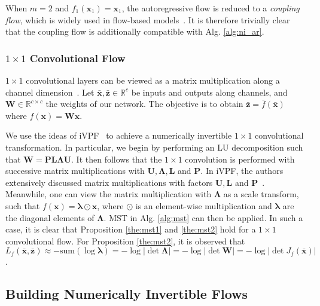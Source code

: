 \documentclass{article}
\newcommand{\qv}[1]{\bar{\mathbf{#1}}}
\begin{document}
When $m = 2$ and $f_1(\mathbf{x}_1) = \mathbf{x}_1$, the autoregressive flow is reduced to a \textit{coupling flow}, which is widely used in flow-based models~\cite{dinh2014nice,dinh2016density,ho2019flow++}. It is therefore trivially clear that the coupling flow is additionally compatible with Alg. \ref{alg:ni_ar}.

\subsubsection{$1 \times 1$ Convolutional Flow}

$1 \times 1$ convolutional layers can be viewed as a matrix multiplication along a channel dimension~\cite{kingma2018glow}. Let $\qv{x}, \qv{z} \in \mathbb{R}^c$ be inputs and outputs along channels, and $\mathbf{W} \in \mathbb{R}^{c \times c}$ the weights of our network. The objective is to obtain $\qv{z} = \bar{f} (\qv{x})$ where $f(\mathbf{x}) = \mathbf{W} \mathbf{x}$.

We use the ideas of iVPF~\cite{zhang2021ivpf} to achieve a numerically invertible $1 \times 1$ convolutional transformation. In particular, we begin by performing an LU decomposition such that $\mathbf{W} = \mathbf{P} \mathbf{L} \mathbf{\Lambda} \mathbf{U}$. It then follows that the $1 \times 1$ convolution is performed with successive matrix multiplications with $\mathbf{U}, \mathbf{\Lambda}, \mathbf{L}$ and $ \mathbf{P}$. In iVPF, the authors extensively discussed matrix multiplications with factors $\mathbf{U}, \mathbf{L} $ and $ \mathbf{P}$~\cite{zhang2021ivpf}. Meanwhile, one can view the matrix multiplication with $\mathbf{\Lambda}$ as a scale transform, such that $f(\mathbf{x}) = \bm{\lambda} \odot \mathbf{x}$, where $\odot$ is an element-wise multiplication and $\bm{\lambda}$ are the diagonal elements of $\mathbf{\Lambda}$. MST in Alg. \ref{alg:mst} can then be applied. In such a case, it is clear that Proposition \ref{the:mst1} and \ref{the:mst2} hold for a $1 \times 1$ convolutional flow. For Proposition \ref{the:mst2}, it is observed that $L_f (\qv{x}, \qv{z}) \approx -\mathrm{sum}(\log \bm{\lambda}) = - \log |\det \bm{\Lambda}| = - \log |\det \mathbf{W}| = -\log |\det J_f (\qv{x})|$.





\subsection{Building Numerically Invertible Flows}
\label{sec:inv_model}
\end{document}
